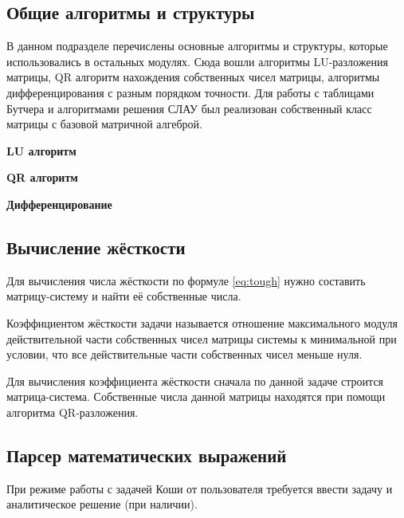 \subsection{Общие алгоритмы и структуры}

В данном подразделе перечислены основные алгоритмы и структуры, которые использовались в остальных модулях. Сюда вошли алгоритмы
LU-разложения матрицы, QR алгоритм нахождения собственных чисел матрицы, алгоритмы дифференцирования с разным порядком точности. Для
работы с таблицами Бутчера и алгоритмами решения СЛАУ был реализован собственный класс матрицы с базовой матричной алгеброй.

\textbf{LU алгоритм}

\textbf{QR алгоритм}

\textbf{Дифференцирование}

\subsection{Вычисление жёсткости}

Для вычисления числа жёсткости по формуле \ref{eq:tough} нужно составить матрицу-систему и найти её собственные числа.

Коэффициентом жёсткости задачи называется отношение максимального модуля действительной части собственных чисел матрицы системы к
минимальной при условии, что все действительные части собственных чисел меньше нуля.

Для вычисления коэффициента жёсткости сначала по данной задаче строится матрица-система. Собственные числа данной матрицы находятся
при помощи алгоритма QR-разложения.







\subsection{Парсер математических выражений}

При режиме работы с задачей Коши от пользователя требуется ввести задачу и аналитическое решение (при наличии). 

